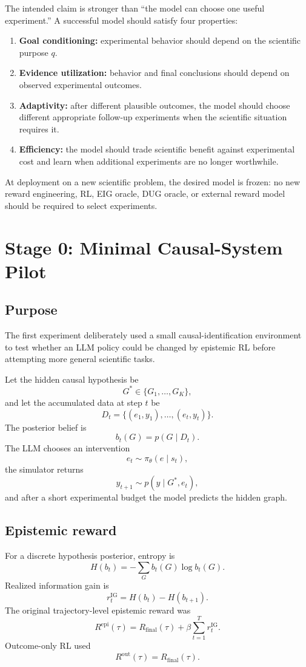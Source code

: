 \documentclass[11pt]{article}
\begin{document}
The intended claim is stronger than ``the model can choose one useful experiment.'' A successful model should satisfy four properties:
\begin{enumerate}
    \item \textbf{Goal conditioning:} experimental behavior should depend on the scientific purpose $q$.
    \item \textbf{Evidence utilization:} behavior and final conclusions should depend on observed experimental outcomes.
    \item \textbf{Adaptivity:} after different plausible outcomes, the model should choose different appropriate follow-up experiments when the scientific situation requires it.
    \item \textbf{Efficiency:} the model should trade scientific benefit against experimental cost and learn when additional experiments are no longer worthwhile.
\end{enumerate}
At deployment on a new scientific problem, the desired model is frozen: no new reward engineering, RL, EIG oracle, DUG oracle, or external reward model should be required to select experiments.

\section{Stage 0: Minimal Causal-System Pilot}
\subsection{Purpose}
The first experiment deliberately used a small causal-identification environment to test whether an LLM policy could be changed by epistemic RL before attempting more general scientific tasks.

Let the hidden causal hypothesis be
\[
G^*\in\{G_1,\ldots,G_K\},
\]
and let the accumulated data at step $t$ be
\[
D_t=\{(e_1,y_1),\ldots,(e_t,y_t)\}.
\]
The posterior belief is
\[
b_t(G)=p(G\mid D_t).
\]
The LLM chooses an intervention
\[
e_t\sim\pi_\theta(e\mid s_t),
\]
the simulator returns
\[
y_{t+1}\sim p(y\mid G^*,e_t),
\]
and after a short experimental budget the model predicts the hidden graph.

\subsection{Epistemic reward}
For a discrete hypothesis posterior, entropy is
\[
H(b_t)=-\sum_G b_t(G)\log b_t(G).
\]
Realized information gain is
\[
r_t^{\mathrm{IG}}=H(b_t)-H(b_{t+1}).
\]
The original trajectory-level epistemic reward was
\[
R^{\mathrm{epi}}(\tau)
=R_{\mathrm{final}}(\tau)+\beta\sum_{t=1}^{T}r_t^{\mathrm{IG}}.
\]
Outcome-only RL used
\[
R^{\mathrm{out}}(\tau)=R_{\mathrm{final}}(\tau).
\]
\end{document}
